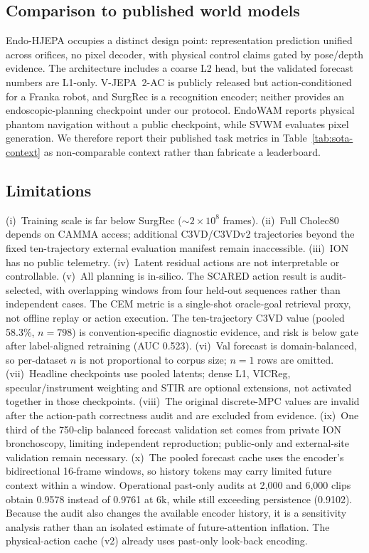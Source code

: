 \documentclass[preprint,12pt]{elsarticle}
\begin{document}
\subsection{Comparison to published world models}
Endo-HJEPA occupies a distinct design point: representation
prediction unified across orifices, no pixel decoder, with physical control
claims gated by pose/depth evidence. The architecture includes a coarse L2
head, but the validated forecast numbers are L1-only.
V-JEPA~2-AC is publicly released but action-conditioned for a Franka robot,
and SurgRec is a recognition encoder; neither provides an
endoscopic-planning checkpoint under our protocol. EndoWAM reports
physical phantom navigation without a public checkpoint, while SVWM evaluates
pixel generation. We therefore report their published task metrics in
Table~\ref{tab:sota-context} as non-comparable context rather than fabricate a
leaderboard.

\subsection{Limitations}
(i)~Training scale is far below SurgRec (${\sim}2{\times}10^8$ frames).
(ii)~Full Cholec80 depends on CAMMA access; additional C3VD/C3VDv2
trajectories beyond the fixed ten-trajectory external evaluation manifest
remain inaccessible.
(iii)~ION has no public telemetry.
(iv)~Latent residual actions are not interpretable or controllable.
(v)~All planning is in-silico. The SCARED action result is audit-selected,
with overlapping windows from four held-out sequences rather than independent
cases. The CEM metric is a single-shot oracle-goal retrieval proxy, not
offline replay or action execution. The ten-trajectory C3VD value (pooled
58.3\%, $n{=}798$) is convention-specific diagnostic evidence, and risk is
below gate after label-aligned retraining (AUC 0.523).
(vi)~Val forecast is domain-balanced, so per-dataset $n$ is not proportional to corpus size; $n{=}1$ rows are omitted.
(vii)~Headline checkpoints use pooled latents; dense L1, VICReg,
specular/instrument weighting and STIR are optional extensions, not activated
together in those checkpoints.
(viii)~The original discrete-MPC values are invalid after the action-path
correctness audit and are excluded from evidence.
(ix)~One third of the 750-clip balanced forecast validation set comes from
private ION bronchoscopy, limiting independent reproduction; public-only and
external-site validation remain necessary.
(x)~The pooled forecast cache uses the encoder's bidirectional 16-frame
windows, so history tokens may carry limited future context within a window.
Operational past-only audits at 2{,}000 and 6{,}000 clips obtain 0.9578
instead of 0.9761 at 6k, while still exceeding persistence (0.9102). Because
the audit also changes the available encoder history, it is a sensitivity
analysis rather than an isolated estimate of future-attention inflation. The
physical-action cache (v2) already uses past-only look-back encoding.
\end{document}
